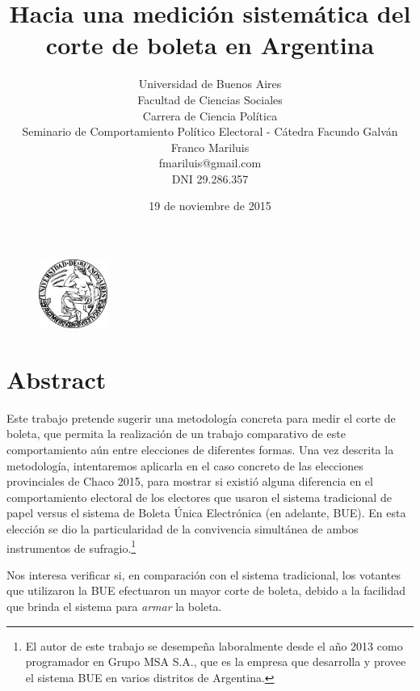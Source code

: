 \documentclass[12pt,a4paper]{article}
\begin{document}
 \begin{figure}[h!]
   \centering
   \includegraphics[width=0.20\textwidth]{uba_logo}~\\[1cm]
\title{Hacia una medición sistemática del corte de boleta en Argentina}
\author{
  Universidad de Buenos Aires\\
  Facultad de Ciencias Sociales\\
    Carrera de Ciencia Política \\
    Seminario de Comportamiento Político Electoral - Cátedra Facundo Galván\\
  Franco Mariluis\\
  fmariluis@gmail.com\\
  DNI 29.286.357\\
}
\date{19 de noviembre de 2015}
\maketitle
 \end{figure}

\clearpage 

\section{Abstract}
Este trabajo pretende sugerir una metodología concreta para medir el corte de
boleta, que permita la realización de un trabajo comparativo de este
comportamiento aún entre elecciones de
diferentes formas.
Una vez descrita la metodología, intentaremos aplicarla en el caso concreto de
las elecciones provinciales de Chaco 2015, para mostrar si existió alguna
diferencia en el comportamiento electoral de los electores que usaron el sistema
tradicional de papel versus el sistema de Boleta Única Electrónica (en adelante,
BUE). 
En esta elección se dio la particularidad de la convivencia simultánea de ambos
instrumentos de sufragio.\footnote{El autor de
este trabajo se desempeña laboralmente desde el año 2013 como programador en Grupo MSA S.A., que
es la empresa que desarrolla y provee el sistema BUE en varios distritos de Argentina.}

Nos interesa verificar si, en comparación con el sistema tradicional, los
votantes que utilizaron la BUE efectuaron un mayor corte de boleta, debido a la
facilidad que brinda el sistema para \emph{armar} la boleta.
\end{document}
